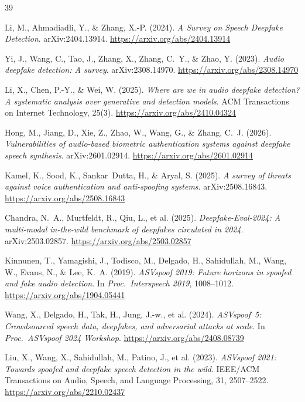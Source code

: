 \documentclass[11pt,a4paper]{article}
\begin{document}
\begin{thebibliography}{39}

Li, M., Ahmadiadli, Y., \& Zhang, X.-P. (2024).
\textit{A Survey on Speech Deepfake Detection}. arXiv:2404.13914.
\url{https://arxiv.org/abs/2404.13914}

Yi, J., Wang, C., Tao, J., Zhang, X., Zhang, C.~Y., \& Zhao, Y. (2023).
\textit{Audio deepfake detection: A survey}. arXiv:2308.14970.
\url{https://arxiv.org/abs/2308.14970}

Li, X., Chen, P.-Y., \& Wei, W. (2025).
\textit{Where are we in audio deepfake detection? A systematic analysis over
generative and detection models}.
ACM Transactions on Internet Technology, 25(3).
\url{https://arxiv.org/abs/2410.04324}

Hong, M., Jiang, D., Xie, Z., Zhao, W., Wang, G., \& Zhang, C.~J. (2026).
\textit{Vulnerabilities of audio-based biometric authentication systems against
deepfake speech synthesis}. arXiv:2601.02914.
\url{https://arxiv.org/abs/2601.02914}

Kamel, K., Sood, K., Sankar~Dutta, H., \& Aryal, S. (2025).
\textit{A survey of threats against voice authentication and anti-spoofing
systems}. arXiv:2508.16843.
\url{https://arxiv.org/abs/2508.16843}

Chandra, N.~A., Murtfeldt, R., Qiu, L., et al. (2025).
\textit{Deepfake-Eval-2024: A multi-modal in-the-wild benchmark of deepfakes
circulated in 2024}. arXiv:2503.02857.
\url{https://arxiv.org/abs/2503.02857}

Kinnunen, T., Yamagishi, J., Todisco, M., Delgado, H., Sahidullah, M.,
Wang, W., Evans, N., \& Lee, K.~A. (2019).
\textit{ASVspoof 2019: Future horizons in spoofed and fake audio detection}.
In \textit{Proc.\ Interspeech 2019}, 1008--1012.
\url{https://arxiv.org/abs/1904.05441}

Wang, X., Delgado, H., Tak, H., Jung, J.-w., et al. (2024).
\textit{ASVspoof~5: Crowdsourced speech data, deepfakes, and adversarial
attacks at scale}.
In \textit{Proc.\ ASVspoof 2024 Workshop}.
\url{https://arxiv.org/abs/2408.08739}

Liu, X., Wang, X., Sahidullah, M., Patino, J., et al. (2023).
\textit{ASVspoof 2021: Towards spoofed and deepfake speech detection in the wild}.
IEEE/ACM Transactions on Audio, Speech, and Language Processing, 31, 2507--2522.
\url{https://arxiv.org/abs/2210.02437}


\end{thebibliography}
\end{document}
